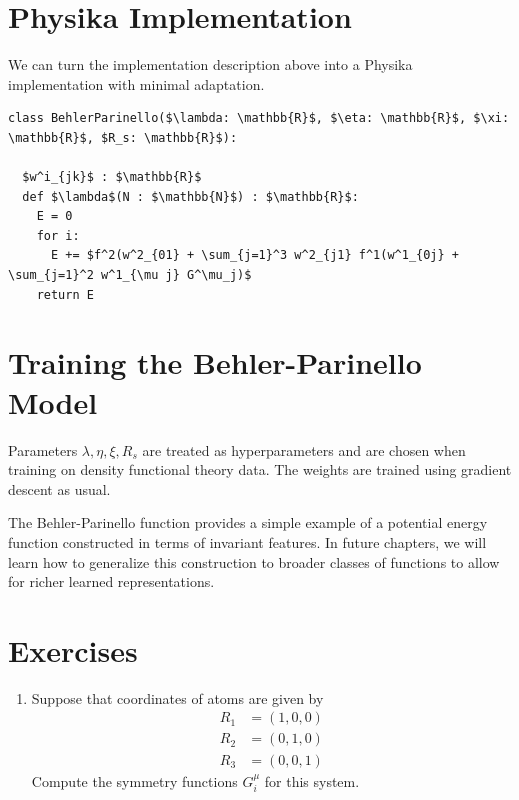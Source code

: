 \documentclass[book.tex]{subfiles}
\begin{document}
\section{Physika Implementation}

We can turn the implementation description above into a Physika implementation with minimal adaptation.

\begin{lstlisting}
class BehlerParinello($\lambda: \mathbb{R}$, $\eta: \mathbb{R}$, $\xi: \mathbb{R}$, $R_s: \mathbb{R}$):

  $w^i_{jk}$ : $\mathbb{R}$
  def $\lambda$(N : $\mathbb{N}$) : $\mathbb{R}$:
    E = 0
    for i:
      E += $f^2(w^2_{01} + \sum_{j=1}^3 w^2_{j1} f^1(w^1_{0j} + \sum_{j=1}^2 w^1_{\mu j} G^\mu_j)$
    return E

\end{lstlisting}



\section{Training the Behler-Parinello Model} 
Parameters $\lambda, \eta, \xi, R_s$ are treated as hyperparameters and are chosen when training on density functional theory data. The weights are trained using gradient descent as usual.

The Behler-Parinello function provides a simple example of a potential energy function constructed in terms of invariant features. In future chapters, we will learn how to generalize this construction to broader classes of functions to allow for richer learned representations. 


\section{Exercises}

\begin{enumerate}
    \item Suppose that coordinates of atoms are given by
    \begin{align}
        R_1 &= (1, 0, 0) \\
        R_2 &= (0, 1, 0) \\
        R_3 &= (0, 0, 1)
    \end{align}
    Compute the symmetry functions $G^{\mu}_i$ for this system.
\end{enumerate}
\end{document}
